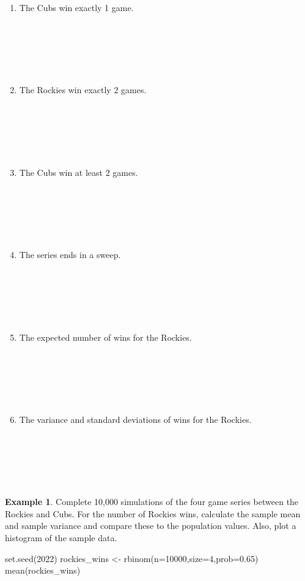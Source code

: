 \documentclass[
  11pt,
]{book}
\newenvironment{Shaded}{\begin{snugshade}}{\end{snugshade}}
\newcommand{\AttributeTok}[1]{\textcolor[rgb]{0.77,0.63,0.00}{#1}}
\newcommand{\DecValTok}[1]{\textcolor[rgb]{0.00,0.00,0.81}{#1}}
\newcommand{\FloatTok}[1]{\textcolor[rgb]{0.00,0.00,0.81}{#1}}
\newcommand{\FunctionTok}[1]{\textcolor[rgb]{0.00,0.00,0.00}{#1}}
\newcommand{\NormalTok}[1]{#1}
\newcommand{\OtherTok}[1]{\textcolor[rgb]{0.56,0.35,0.01}{#1}}
\theoremstyle{definition}
\theoremstyle{definition}
\newtheorem{example}{Example}[chapter]
\theoremstyle{definition}
\theoremstyle{definition}
\theoremstyle{remark}
\begin{document}
\begin{enumerate}
\def\labelenumi{(\alph{enumi})}
\item
  The Cubs win exactly 1 game.\\
  \strut \\
  \strut \\
  \strut \\
\item
  The Rockies win exactly 2 games.\\
  \strut \\
  \strut \\
  \strut \\
\item
  The Cubs win at least 2 games.\\
  \strut \\
  \strut \\
  \strut \\
\item
  The series ends in a sweep.\\
  \strut \\
  \strut \\
  \strut \\
\item
  The expected number of wins for the Rockies.\\
  \strut \\
  \strut \\
  \strut \\
\item
  The variance and standard deviations of wins for the Rockies.\\
  \strut \\
  \strut \\
  \strut \\
\end{enumerate}

\begin{example}
Complete 10,000 simulations of the four game series between the Rockies and Cubs. For the number of Rockies wins, calculate the sample mean and sample variance and compare these to the population values. Also, plot a histogram of the sample data.
\end{example}

\begin{Shaded}
\begin{Highlighting}[]
\FunctionTok{set.seed}\NormalTok{(}\DecValTok{2022}\NormalTok{)}
\NormalTok{rockies\_wins }\OtherTok{\textless{}{-}} \FunctionTok{rbinom}\NormalTok{(}\AttributeTok{n=}\DecValTok{10000}\NormalTok{,}\AttributeTok{size=}\DecValTok{4}\NormalTok{,}\AttributeTok{prob=}\FloatTok{0.65}\NormalTok{)}
\FunctionTok{mean}\NormalTok{(rockies\_wins)}
\end{Highlighting}
\end{Shaded}
\end{document}
